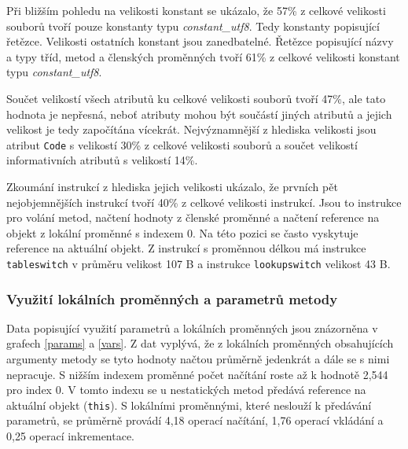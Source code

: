 Při bližším pohledu na velikosti konstant se ukázalo, že 57\% z celkové velikosti souborů tvoří pouze konstanty typu \textit{constant\_utf8}. Tedy konstanty popisující řetězce. Velikosti ostatních konstant jsou zanedbatelné. Řetězce popisující názvy a typy tříd, metod a členských proměnných tvoří 61\% z celkové velikosti konstant typu \textit{constant\_utf8}.

Součet velikostí všech atributů ku celkové velikosti souborů tvoří 47\%, ale tato hodnota je nepřesná, neboť atributy mohou být součástí jiných atributů a jejich velikost je tedy započítána vícekrát. Nejvýznamnější z hlediska velikosti jsou atribut \texttt{Code} s velikostí 30\% z celkové velikosti souborů a součet velikostí informativních atributů s velikostí 14\%.

Zkoumání instrukcí z hlediska jejich velikosti ukázalo, že prvních pět nejobjemnějších instrukcí tvoří 40\% z celkové velikosti instrukcí. Jsou to instrukce pro volání metod, načtení hodnoty z členské proměnné a načtení reference na objekt z lokální proměnné s indexem 0. Na této pozici se často vyskytuje reference na aktuální objekt. Z instrukcí s proměnnou délkou má instrukce \texttt{tableswitch} v průměru velikost 107 B a instrukce \texttt{lookupswitch} velikost 43 B.


\subsubsection{Využití lokálních proměnných a parametrů metody}

Data popisující využití parametrů a lokálních proměnných jsou znázorněna v grafech \ref{params} a \ref{vars}. Z dat vyplývá, že z lokálních proměnných obsahujících argumenty metody se tyto hodnoty načtou průměrně jedenkrát a dále se s nimi nepracuje. S nižším indexem proměnné počet načítání roste až k hodnotě 2,544 pro index 0. V tomto indexu se u nestatických metod předává reference na aktuální objekt (\texttt{this}). S lokálními proměnnými, které neslouží k předávání parametrů, se průměrně provádí 4,18 operací načítání, 1,76 operací vkládání a 0,25 operací inkrementace.

